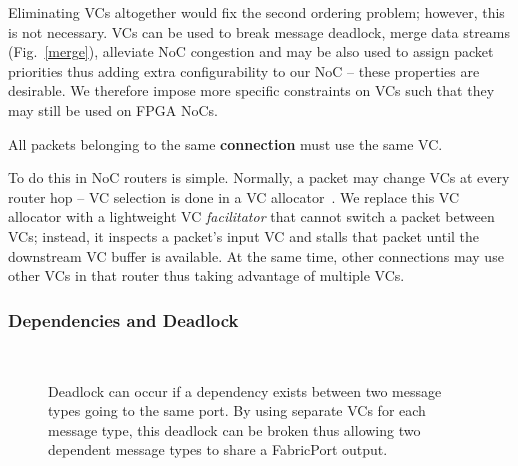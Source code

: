 Eliminating VCs altogether would fix the second ordering problem; however, this is not necessary.
VCs can be used to break message deadlock, merge data streams (Fig.~\ref{merge}), alleviate NoC congestion and may be also used to assign packet priorities thus adding extra configurability to our NoC -- these properties are desirable.
We therefore impose more specific constraints on VCs such that they may still be used on FPGA NoCs.
%
\begin{cond}
All packets belonging to the same \textbf{connection} must use the same VC.
\end{cond}
%


To do this in NoC routers is simple.
Normally, a packet may change VCs at every router hop -- VC selection is done in a VC allocator~\cite{dally_book}.
We replace this VC allocator with a lightweight VC \textit{facilitator} that cannot switch a packet between VCs; instead, it inspects a packet's input VC and stalls that packet until the downstream VC buffer is available.
At the same time, other connections may use other VCs in that router thus taking advantage of multiple VCs.


%
\subsubsection{Dependencies and Deadlock}
%

\begin{figure}[t]
\centering
{}
 \\
\caption{Deadlock can occur if a dependency exists between two message types going to the same port. By using separate VCs for each message type, this deadlock can be broken thus allowing two dependent message types to share a FabricPort output.}
\label{dead}
\end{figure}


